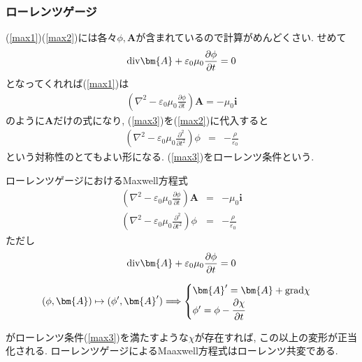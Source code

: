 \documentclass[10.5pt,a4paper]{jreport}
\begin{document}
\subsubsection{ローレンツゲージ}
(\ref{max1})(\ref{max2})には各々$\phi, \bm{A}$が含まれているので計算がめんどくさい. せめて
\begin{eqnarray}
  {\rm div}\bm{A} + \varepsilon_0\mu_0\frac{\partial \phi}{\partial t} = 0\label{max3}
\end{eqnarray}
となってくれれば(\ref{max1})は
\begin{eqnarray}
  \left(\nabla^2 - \varepsilon_0\mu_0\frac{\partial \phi}{\partial t}\right)\bm{A} = -\mu_0\bm{i}\label{max4}
\end{eqnarray}
のように$\bm{A}$だけの式になり, (\ref{max3})を(\ref{max2})に代入すると
\begin{eqnarray}
  \left(\nabla^2 - \varepsilon_0\mu_0\frac{\partial^2}{\partial t^2}\right)\phi &=& -\frac{\rho}{\varepsilon_0}
\end{eqnarray}
という対称性のとてもよい形になる. (\ref{max3})をローレンツ条件という.
\begin{itembox}[c]{ローレンツゲージにおけるMaxwell方程式}
  \begin{eqnarray}
    \nonumber    \left(\nabla^2 - \varepsilon_0\mu_0\frac{\partial \phi}{\partial t}\right)\bm{A} &=& -\mu_0\bm{i}\\
    \nonumber    \left(\nabla^2 - \varepsilon_0\mu_0\frac{\partial^2}{\partial t^2}\right)\phi &=& -\frac{\rho}{\varepsilon_0}
  \end{eqnarray}
  ただし
  \begin{eqnarray}
    \nonumber    {\rm div}\bm{A} + \varepsilon_0\mu_0\frac{\partial \phi}{\partial t} = 0
  \end{eqnarray}
\end{itembox}
\begin{eqnarray}
  (\phi, \bm{A})\mapsto(\phi', \bm{A}') \Longrightarrow
  \begin{cases}
    \bm{A}' = \bm{A} + {\rm grad}\chi\\
    \phi' = \phi - \cfrac{\partial \chi}{\partial t}
  \end{cases}
\end{eqnarray}

がローレンツ条件(\ref{max3})を満たすような$\chi$が存在すれば, この以上の変形が正当化される. ローレンツゲージによるMaaxwell方程式はローレンツ共変である. 
\end{document}
